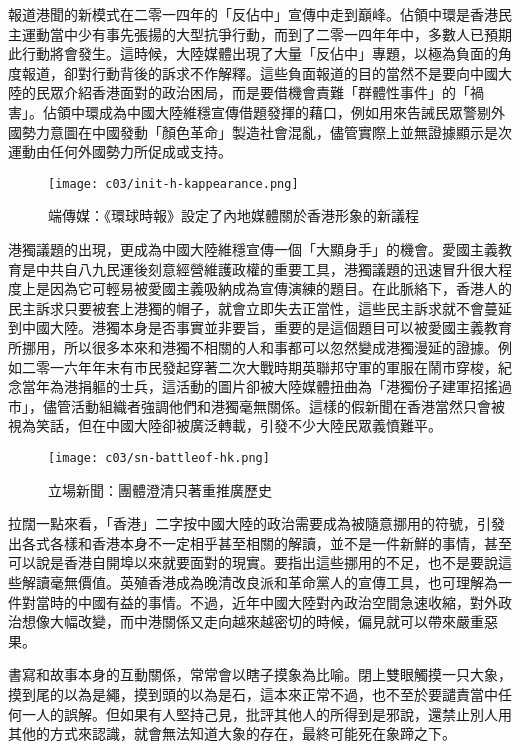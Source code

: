 報道港聞的新模式在二零一四年的「反佔中」宣傳中走到巔峰。佔領中環是香港民主運動當中少有事先張揚的大型抗爭行動，而到了二零一四年年中，多數人已預期此行動將會發生。這時候，大陸媒體出現了大量「反佔中」專題，以極為負面的角度報道，卻對行動背後的訴求不作解釋。這些負面報道的目的當然不是要向中國大陸的民眾介紹香港面對的政治困局，而是要借機會責難「群體性事件」的「禍害」。佔領中環成為中國大陸維穩宣傳借題發揮的藉口，例如用來告誡民眾警剔外國勢力意圖在中國發動「顏色革命」製造社會混亂，儘管實際上並無證據顯示是次運動由任何外國勢力所促成或支持。

\begin{figure}[htbp]
    \centering
    \texttt{[image: c03/init-h-kappearance.png]}
    \caption{端傳媒：《環球時報》設定了內地媒體關於香港形象的新議程} 
\end{figure}

港獨議題的出現，更成為中國大陸維穩宣傳一個「大顯身手」的機會。愛國主義教育是中共自八九民運後刻意經營維護政權的重要工具，港獨議題的迅速冒升很大程度上是因為它可輕易被愛國主義吸納成為宣傳演練的題目。在此脈絡下，香港人的民主訴求只要被套上港獨的帽子，就會立即失去正當性，這些民主訴求就不會蔓延到中國大陸。港獨本身是否事實並非要旨，重要的是這個題目可以被愛國主義教育所挪用，所以很多本來和港獨不相關的人和事都可以忽然變成港獨漫延的證據。例如二零一六年年末有市民發起穿著二次大戰時期英聯邦守軍的軍服在鬧市穿梭，紀念當年為港捐軀的士兵，這活動的圖片卻被大陸媒體扭曲為「港獨份子建軍招搖過市」，儘管活動組織者強調他們和港獨毫無關係。這樣的假新聞在香港當然只會被視為笑話，但在中國大陸卻被廣泛轉載，引發不少大陸民眾義憤難平。

\begin{figure}[htbp]
    \centering
    \texttt{[image: c03/sn-battleof-hk.png]}
    \caption{立場新聞：團體澄清只著重推廣歷史} 
\end{figure}

拉闊一點來看，「香港」二字按中國大陸的政治需要成為被隨意挪用的符號，引發出各式各樣和香港本身不一定相乎甚至相關的解讀，並不是一件新鮮的事情，甚至可以說是香港自開埠以來就要面對的現實。要指出這些挪用的不足，也不是要說這些解讀毫無價值。英殖香港成為晚清改良派和革命黨人的宣傳工具，也可理解為一件對當時的中國有益的事情。不過，近年中國大陸對內政治空間急速收縮，對外政治想像大幅改變，而中港關係又走向越來越密切的時候，偏見就可以帶來嚴重惡果。

書寫和故事本身的互動關係，常常會以瞎子摸象為比喻。閉上雙眼觸摸一只大象，摸到尾的以為是繩，摸到頭的以為是石，這本來正常不過，也不至於要譴責當中任何一人的誤解。但如果有人堅持己見，批評其他人的所得到是邪說，還禁止別人用其他的方式來認識，就會無法知道大象的存在，最終可能死在象蹄之下。

